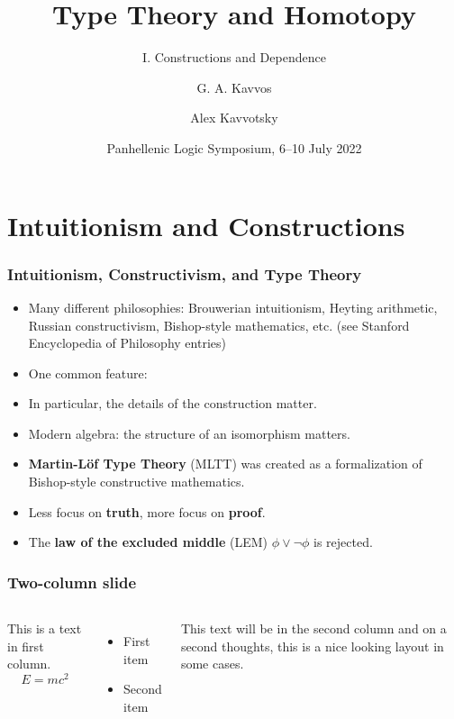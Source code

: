 \documentclass{beamer} %
\title{Type Theory and Homotopy}
\subtitle{I. Constructions and Dependence}
\author{
  G. A. Kavvos \inst{1}
  \and
  Alex Kavvotsky \inst{2}
}
\institute{
  \inst{1} University of Bristol
  \inst{2} Technological University of Elbonia
}
\date{Panhellenic Logic Symposium, 6--10 July 2022}
\begin{document}
\frame{\titlepage}


\section{Intuitionism and Constructions}

\begin{frame}
  \frametitle{Intuitionism, Constructivism, and Type Theory}
  
  \begin{itemize}
    \item Many different philosophies: Brouwerian intuitionism, Heyting
      arithmetic, Russian constructivism, Bishop-style mathematics, etc. (see
      Stanford Encyclopedia of Philosophy entries)

    \item One common feature:
      \begin{center}
      \end{center}
      
    \item In particular, the details of the construction matter.
      
    \item Modern algebra: the structure of an isomorphism matters.

    \item \textbf{Martin-L\"of Type Theory} (MLTT) was created as a
      formalization of Bishop-style constructive mathematics.
      
    \item Less focus on \textbf{truth}, more focus on \textbf{proof}.

    \item The \textbf{law of the excluded middle} (LEM) $\phi \lor \lnot \phi$
      is rejected.
  \end{itemize}
\end{frame}

\begin{frame}
  \frametitle{Two-column slide}
  \begin{columns}
  This is a text in first column.
  $$E=mc^2$$
  \begin{itemize}
  \item First item
  \item Second item
  \end{itemize}
  
  This text will be in the second column
  and on a second thoughts, this is a nice looking
  layout in some cases.
  \end{columns}
  \end{frame}
  
\end{document}
